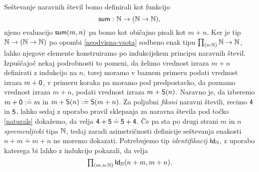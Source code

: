 \begin{primer}
  Seštevanje naravnih števil bomo definirali kot funkcijo
  \[\textnormal{\textsf{sum}} \,\colon \mathbb N \to (\mathbb N \to \mathbb N),\] njeno evaluacijo \(\textnormal{\textsf{sum}}(m, n)\)
  pa bomo kot običajno pisali kot \(m + n\).
  Ker je tip \(\mathbb N \to (\mathbb N \to \mathbb N)\) po opombi \ref{neodvisna-vsota} sodbeno enak tipu
  \(\textstyle \prod_{\left( n : \mathbb N \right)} \mathbb N \to \mathbb N\), lahko njegove elemente konstruiramo po indukcijskem
  principu naravnih števil.
  Izpuščajoč nekaj podrobnosti to pomeni, da želimo vrednost izraza \(m + n\) definirati z
  indukcijo na \(n\), torej moramo v baznem primeru podati vrednost izraza \(m + \textnormal{\textsf{0}}\),
  v primeru koraka pa moramo pod predpostavko, da poznamo vrednost izraza \(m + n\),
  podati vrednost izraza \(m + \textnormal{\textsf{S}}(n)\). Naravno je,
  da izberemo \(m + \textnormal{\textsf{0}} :\doteq m\) in \(m + \textnormal{\textsf{S}}(n) :\doteq\textnormal{\textsf{S}}(m + n)\).
  Za poljubni \emph{fiksni} naravni števili, recimo
  \(\textnormal{\textsf{4}}\) in \(\textnormal{\textsf{5}}\), lahko sedaj z uporabo pravil sklepanja za naravna
  števila pod točko \ref{naturals} dokažemo, da velja
  \(\textnormal{\textsf{4}} + \textnormal{\textsf{5}} \doteq \textnormal{\textsf{5}} + \textnormal{\textsf{4}}\). Če pa sta po drugi strani
  \(m\) in \(n\)
  \emph{spremenljivki} tipa \(\mathbb N\), tedaj zaradi asimetričnosti definicije seštevanja
  enakosti \(n + m \doteq m + n\) ne moremo
  dokazati. Potrebujemo tip \emph{identifikacij} \(\textnormal{\textsf{Id}}_{\mathbb N}\), z uporabo katerega bi
  lahko z indukcijo pokazali, da velja \[\textstyle \prod_{\left( m, n : \mathbb N \right)} \textnormal{\textsf{Id}}_{\mathbb N}(n + m, m + n).\]
\end{primer}

